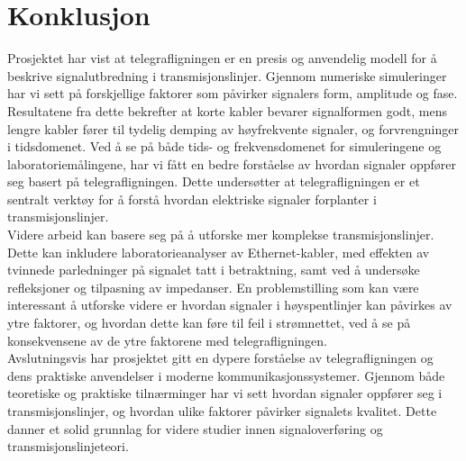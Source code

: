 \section{Konklusjon}
Prosjektet har vist at telegrafligningen er en presis og anvendelig modell for å beskrive signalutbredning i transmisjonslinjer. Gjennom numeriske simuleringer har vi sett på forskjellige faktorer som påvirker signalers form, amplitude og fase. Resultatene fra dette bekrefter at korte kabler bevarer signalformen godt, mens lengre kabler fører til tydelig demping av høyfrekvente signaler, og forvrengninger i tidsdomenet. Ved å se på både tids- og frekvensdomenet for simuleringene og laboratoriemålingene, har vi fått en bedre forståelse av hvordan signaler oppfører seg basert på telegrafligningen. Dette undersøtter at telegrafligningen er et sentralt verktøy for å forstå hvordan elektriske signaler forplanter i transmisjonslinjer.
\\[1em]
Videre arbeid kan basere seg på å utforske mer komplekse transmisjonslinjer. Dette kan inkludere laboratorieanalyser av Ethernet-kabler, med effekten av tvinnede parledninger på signalet tatt i betraktning, samt ved å undersøke refleksjoner og tilpasning av impedanser. En problemstilling som kan være interessant å utforske videre er hvordan signaler i høyspentlinjer kan påvirkes av ytre faktorer, og hvordan dette kan føre til feil i strømnettet, ved å se på konsekvensene av de ytre faktorene med telegrafligningen.
\\[1em]
Avslutningsvis har prosjektet gitt en dypere forståelse av telegrafligningen og dens praktiske anvendelser i moderne kommunikasjonssystemer. Gjennom både teoretiske og praktiske tilnærminger har vi sett hvordan signaler oppfører seg i transmisjonslinjer, og hvordan ulike faktorer påvirker signalets kvalitet. Dette danner et solid grunnlag for videre studier innen signaloverføring og transmisjonslinjeteori.